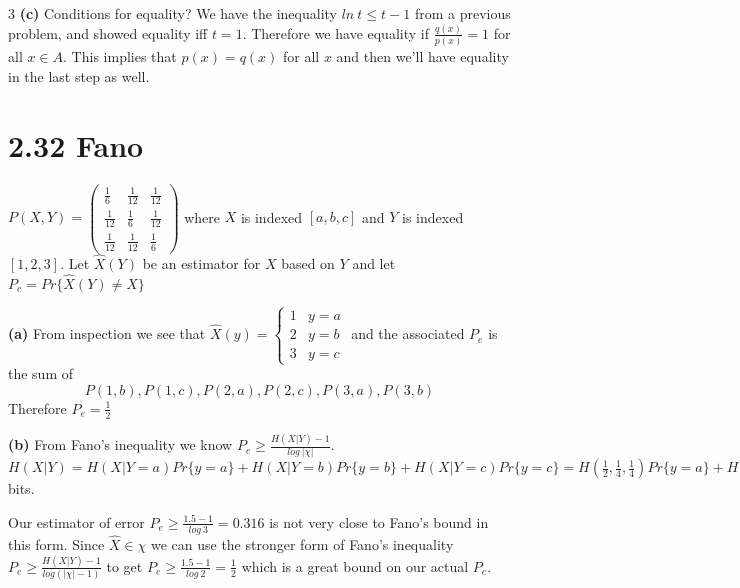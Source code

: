 \documentclass[10pt]{article}
\begin{document}
\begin{tiny}
\begin{multicols}{3}
\textbf{(c)} Conditions for equality?
We have the inequality $ln\ t \leq t-1$ from a previous problem, and showed equality iff $t=1$. Therefore we have equality if $\frac{q(x)}{p(x)}=1$ for all $x\in A$. This implies that $p(x)=q(x)$ for all $x$ and then we'll have equality in the last step as well. 	
          
\section*{2.32 Fano}
\(P(X,Y) = \left( \begin{array}{ccc}
\frac{1}{6} & \frac{1}{12} & \frac{1}{12} \\
\frac{1}{12} & \frac{1}{6} & \frac{1}{12} \\
\frac{1}{12} & \frac{1}{12} & \frac{1}{6} \end{array} \right)\)
 where $X$ is indexed $[a,b,c]$ and $Y$ is indexed $[1,2,3]$. Let $\hat{X}(Y)$  be an estimator for $X$ based on $Y$ and let $P_e=Pr\{\hat{X}(Y)\neq X\}$

\textbf{(a)}
From inspection we see that 
\(\hat{X}(y)=\left\{ \begin{array}{cc}
1 & y=a\\
2 & y=b\\
3 & y=c \end{array}\right. \)
and the associated $P_e$ is the sum of 
\[
P(1,b),  P(1,c), P(2,a),
P(2,c), P(3,a), P(3,b) \] Therefore $P_e=\frac{1}{2}$

\textbf{(b)}
From Fano's inequality we know \(P_e \geq \frac{H(X|Y)-1}{log\ |\chi|}\). \(
H(X|Y)= H(X|Y=a)Pr\{y=a\}+H(X|Y=b)Pr\{y=b\}+H(X|Y=c)Pr\{y=c\}
=H\left(\frac{1}{2},\frac{1}{4},\frac{1}{4}\right)Pr\{y=a\}+H\left(\frac{1}{2},\frac{1}{4},\frac{1}{4}\right)Pr\{y=b\}+H\left(\frac{1}{2},\frac{1}{4},\frac{1}{4}\right)Pr\{y=c\}
=H\left(\frac{1}{2},\frac{1}{4},\frac{1}{4}\right)\left( Pr\{y=a\}+Pr\{y=b\}+Pr\{y=c\}\right)
=H\left(\frac{1}{2},\frac{1}{4},\frac{1}{4}\right)
=1.5 \) bits. 

Our estimator of error $P_e\geq \frac{1.5-1}{log\ 3}=0.316$ is not very close to Fano's bound in this form. Since $\hat{X}\in \chi$ we can use the stronger form of Fano's inequality 
\( P_e \geq \frac{H(X|Y)-1}{log(|\chi|-1)}  \) to get \( P_e \geq \frac{1.5-1}{log\ 2}=\frac{1}{2} \) which is a great bound on our actual $P_e$.


\end{multicols}
\end{tiny}
\end{document}

